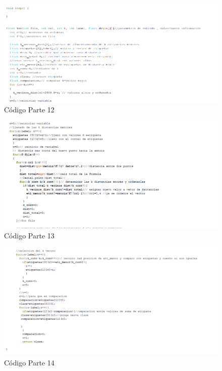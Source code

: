 \documentclass[10pt,a4paper]{article}
\begin{document}
\begin{figure}[H]
\caption{Código Parte 12}
\centering
\includegraphics[scale=0.9]{c12.png}
\end{figure}

\begin{figure}[H]
\caption{Código Parte 13}
\centering
\includegraphics[scale=0.9]{c13.png}
\end{figure}

\begin{figure}[H]
\caption{Código Parte 14}
\centering
\includegraphics[scale=0.9]{c14.png}
\end{figure}
\end{document}
